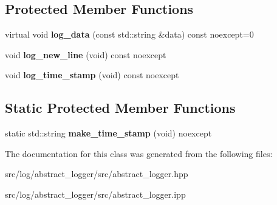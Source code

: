 \subsection*{Protected Member Functions}
\begin{DoxyCompactItemize}
\item 
\hypertarget{classxstd_1_1abstract__logger_a8cf4f5fd1490b54680060022a2f8ac91}{virtual void {\bfseries log\-\_\-data} (const std\-::string \&data) const noexcept=0}\label{classxstd_1_1abstract__logger_a8cf4f5fd1490b54680060022a2f8ac91}

\item 
\hypertarget{classxstd_1_1abstract__logger_a106b39652dd0d1efb32d8ad52ae6555c}{void {\bfseries log\-\_\-new\-\_\-line} (void) const noexcept}\label{classxstd_1_1abstract__logger_a106b39652dd0d1efb32d8ad52ae6555c}

\item 
\hypertarget{classxstd_1_1abstract__logger_a8bed4dfa79399f58146700adfd1ac06f}{void {\bfseries log\-\_\-time\-\_\-stamp} (void) const noexcept}\label{classxstd_1_1abstract__logger_a8bed4dfa79399f58146700adfd1ac06f}

\end{DoxyCompactItemize}
\subsection*{Static Protected Member Functions}
\begin{DoxyCompactItemize}
\item 
\hypertarget{classxstd_1_1abstract__logger_a1077a739173ed39b8f71f0ef69ada29f}{static std\-::string {\bfseries make\-\_\-time\-\_\-stamp} (void) noexcept}\label{classxstd_1_1abstract__logger_a1077a739173ed39b8f71f0ef69ada29f}

\end{DoxyCompactItemize}


The documentation for this class was generated from the following files\-:\begin{DoxyCompactItemize}
\item 
src/log/abstract\-\_\-logger/src/abstract\-\_\-logger.\-hpp\item 
src/log/abstract\-\_\-logger/src/abstract\-\_\-logger.\-ipp\end{DoxyCompactItemize}
